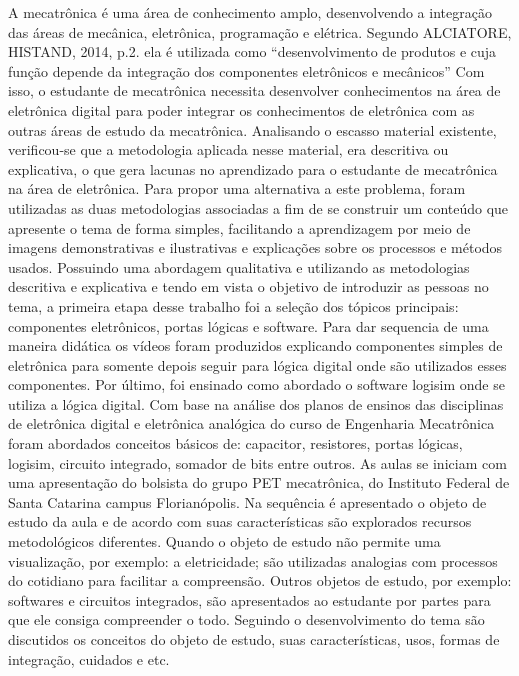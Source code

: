 A mecatrônica é uma área de conhecimento amplo, desenvolvendo a integração das áreas 
de mecânica, eletrônica, programação e elétrica. Segundo ALCIATORE, HISTAND, 2014, p.2. 
ela é utilizada como “desenvolvimento de produtos e cuja função depende da integração dos 
componentes eletrônicos e mecânicos” 
Com isso, o estudante de mecatrônica necessita desenvolver conhecimentos na área de 
eletrônica digital para poder integrar os conhecimentos de eletrônica com as outras áreas de 
estudo da mecatrônica.
Analisando o escasso material existente, verificou-se que a metodologia aplicada nesse material, 
era descritiva ou explicativa, o que gera lacunas no aprendizado para o estudante de mecatrônica 
na área de eletrônica. 
Para propor uma alternativa a este problema, foram utilizadas as duas metodologias 
associadas a fim de se construir um conteúdo que apresente o tema de forma simples, facilitando 
a aprendizagem por meio de imagens demonstrativas e ilustrativas e explicações sobre os 
processos e métodos usados.
Possuindo uma abordagem qualitativa e utilizando as metodologias descritiva e 
explicativa e tendo em vista o objetivo de introduzir as pessoas no tema, a primeira etapa desse 
trabalho foi a seleção dos tópicos principais: componentes eletrônicos, portas lógicas e software. 
Para dar sequencia de uma maneira didática os vídeos foram produzidos explicando 
componentes simples de eletrônica para somente depois seguir para lógica digital onde são 
utilizados esses componentes. Por último, foi ensinado como abordado o software logisim onde 
se utiliza a lógica digital. 
Com base na análise dos planos de ensinos das disciplinas de eletrônica digital e 
eletrônica analógica do curso de Engenharia Mecatrônica foram abordados conceitos básicos de: 
capacitor, resistores, portas lógicas, logisim, circuito integrado, somador de bits entre outros.
As aulas se iniciam com uma apresentação do bolsista do grupo PET mecatrônica, do 
Instituto Federal de Santa Catarina campus Florianópolis. Na sequência é apresentado o objeto 
de estudo da aula e de acordo com suas características são explorados recursos metodológicos 
diferentes. Quando o objeto de estudo não permite uma visualização, por exemplo: a 
eletricidade; são utilizadas analogias com processos do cotidiano para facilitar a compreensão. 
Outros objetos de estudo, por exemplo: softwares e circuitos integrados, são apresentados ao 
estudante por partes para que ele consiga compreender o todo. Seguindo o desenvolvimento do 
tema são discutidos os conceitos do objeto de estudo, suas características, usos, formas de 
integração, cuidados e etc.

